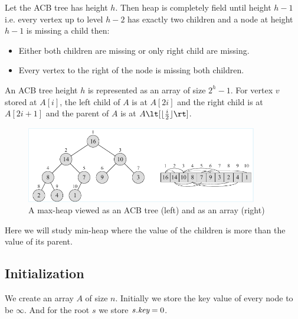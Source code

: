 Let the ACB tree has height $h$. Then heap  is completely field until height $h-1$ i.e. every vertex up to  level $h-2$ has exactly two children and a node at height $h-1$ is missing a child then:\begin{itemize}
	\item Either both children are missing or only right child are missing.
	\item Every vertex to the right of the node is missing both children.
\end{itemize}An ACB tree height $h$ is represented as an array of size $2^h-1$. For vertex $v$ stored at $A[i]$, the left child of $A$ is at $A[2i]$ and the right child is at $A[2i+1]$ and the parent of $A$ is at $A\lt[\lfloor\frac{i}{2}\rfloor\rt]$.
\begin{figure}[h!]
	\centering
	\includegraphics[width=0.9\textwidth]{images/Heap.pdf}
	\caption{A max-heap viewed as an ACB tree (left) and as an array (right)}
\end{figure}

Here we will study min-heap where the value of the children is more than the value of its parent.
\subsection{Initialization}
We create an array $A$ of size $n$. Initially we store the key value of every node to be $\infty$. And for the root $s$ we store $s.\emph{key}=0$.
